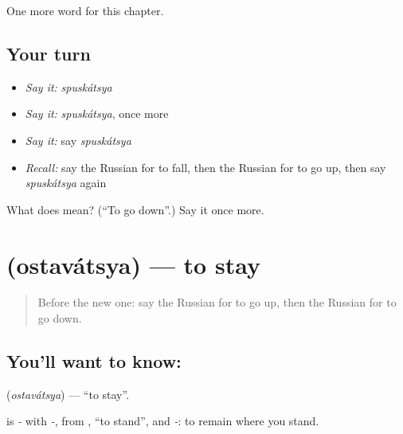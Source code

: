 \begin{grammarlens}[title={What you've built}]
One more word for this chapter.
\end{grammarlens}

\subsection*{Your turn}
\begin{itemize}
\raggedright
  \item \emph{Say it:} \emph{spuskátsya}
  \item \emph{Say it:} \emph{spuskátsya}, once more
  \item \emph{Say it:} say \emph{spuskátsya}
  \item \emph{Recall:} say the Russian for to fall, then the Russian for to go up, then say \emph{spuskátsya} again
\end{itemize}

\begin{tcolorbox}[breakable,colback=teal!4,colframe=teal!35!black,title={Before you move on}]
What does  mean? (\textquotedblleft{}To go down\textquotedblright{}.) Say it once more.
\end{tcolorbox}
\section[\texorpdfstring{\ru{оставаться} (ostavátsya)}{оставаться (ostavátsya)}]{ (ostavátsya) — to stay}

\label{lesson:RU-C133-to-stay}



\begin{quote}
Before the new one: say the Russian for to go up, then the Russian for to go down.
\end{quote}

\subsection*{You'll want to know: }
\textbf{} (\emph{ostavátsya}) — \textquotedblleft{}to stay\textquotedblright{}.

\begin{cousinweb}
\textbf{} is \emph{-} with \emph{-}, from \emph{}, \textquotedblleft{}to stand\textquotedblright{}, and \emph{-}: to remain where you stand.
\end{cousinweb}

